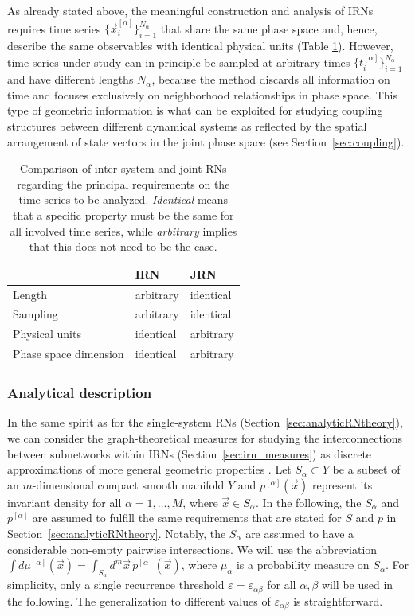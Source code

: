 As already stated above, the meaningful construction and analysis of IRNs requires time series $\{\vec{x}_i^{[\alpha]}\}_{i=1}^{N_\alpha}$ that share the same phase space and, hence, describe the same observables with identical physical units (Table \ref{tab:multivariate_rns}). However, time series under study can in principle be sampled at arbitrary times $\{t^{[\alpha]}_i\}_{i=1}^{N_\alpha}$ and have different lengths $N_\alpha$, because the method discards all information on time and focuses exclusively on neighborhood relationships in phase space. This type of geometric information is what can be exploited for studying coupling structures between different dynamical systems as reflected by the spatial arrangement of state vectors in the joint phase space (see Section~\ref{sec:coupling}).
\begin{table}[tb]
\centering
\setlength{\tabcolsep}{0.2cm}
\begin{tabular}{lll}
\hline
& IRN & JRN \\
\hline
Length & arbitrary & identical \\
Sampling & arbitrary & identical \\
Physical units & identical & arbitrary \\
Phase space dimension & identical & arbitrary \\
\hline
\end{tabular}
\caption[Multivariate generalizations of recurrence network analysis]{Comparison of inter-system and joint RNs regarding the principal requirements on the time series to be analyzed. \emph{Identical} means that a specific property must be the same for all involved time series, while \emph{arbitrary} implies that this does not need to be the case.}
\label{tab:multivariate_rns}
\end{table}%

		\subsubsection{Analytical description}
		In the same spirit as for the single-system RNs (Section~\ref{sec:analyticRNtheory}), we can consider the graph-theoretical measures for studying the interconnections between subnetworks within IRNs (Section~\ref{sec:irn_measures}) as discrete approximations of more general geometric properties \cite{Donges2012PhD}. Let $S_\alpha \subset Y$ be a subset of an $m$-dimensional compact smooth manifold $Y$ and $p^{[\alpha]}(\vec{x})$ represent its invariant density for all $\alpha=1,\dots,M$, where $\vec{x}\in S_\alpha$. In the following, the $S_\alpha$ and $p^{[\alpha]}$ are assumed to fulfill the same requirements that are stated for $S$ and $p$ in Section~\ref{sec:analyticRNtheory}. Notably, the $S_\alpha$ are assumed to have a considerable non-empty pairwise intersections. We will use the abbreviation $\int d\mu^{[\alpha]}(\vec{x})=\int_{S_\alpha} d^m\vec{x}\,p^{[\alpha]}(\vec{x})$, where $\mu_\alpha$ is a probability measure on $S_\alpha$. For simplicity, only a single recurrence threshold $\varepsilon=\varepsilon_{\alpha\beta}$ for all $\alpha, \beta$ will be used in the following. The generalization to different values of $\varepsilon_{\alpha\beta}$ is straightforward.

